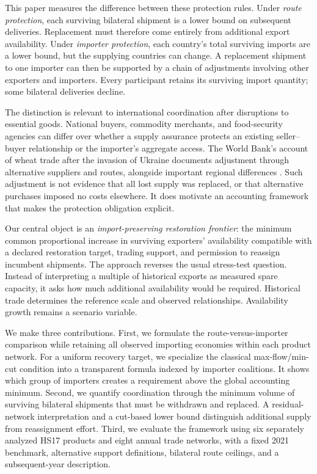 \documentclass[11pt,a4paper]{article}
\begin{document}
This paper measures the difference between these protection rules. Under \emph{route protection}, each surviving bilateral shipment is a lower bound on subsequent deliveries. Replacement must therefore come entirely from additional export availability. Under \emph{importer protection}, each country's total surviving imports are a lower bound, but the supplying countries can change. A replacement shipment to one importer can then be supported by a chain of adjustments involving other exporters and importers. Every participant retains its surviving import quantity; some bilateral deliveries decline.

The distinction is relevant to international coordination after disruptions to essential goods. National buyers, commodity merchants, and food-security agencies can differ over whether a supply assurance protects an existing seller--buyer relationship or the importer's aggregate access. The World Bank's account of wheat trade after the invasion of Ukraine documents adjustment through alternative suppliers and routes, alongside important regional differences \citep{worldbank}. Such adjustment is not evidence that all lost supply was replaced, or that alternative purchases imposed no costs elsewhere. It does motivate an accounting framework that makes the protection obligation explicit.

Our central object is an \emph{import-preserving restoration frontier}: the minimum common proportional increase in surviving exporters' availability compatible with a declared restoration target, trading support, and permission to reassign incumbent shipments. The approach reverses the usual stress-test question. Instead of interpreting a multiple of historical exports as measured spare capacity, it asks how much additional availability would be required. Historical trade determines the reference scale and observed relationships. Availability growth remains a scenario variable.

We make three contributions. First, we formulate the route-versus-importer comparison while retaining all observed importing economies within each product network. For a uniform recovery target, we specialize the classical max-flow/min-cut condition into a transparent formula indexed by importer coalitions. It shows which group of importers creates a requirement above the global accounting minimum. Second, we quantify coordination through the minimum volume of surviving bilateral shipments that must be withdrawn and replaced. A residual-network interpretation and a cut-based lower bound distinguish additional supply from reassignment effort. Third, we evaluate the framework using six separately analyzed HS17 products and eight annual trade networks, with a fixed 2021 benchmark, alternative support definitions, bilateral route ceilings, and a subsequent-year description.
\end{document}
